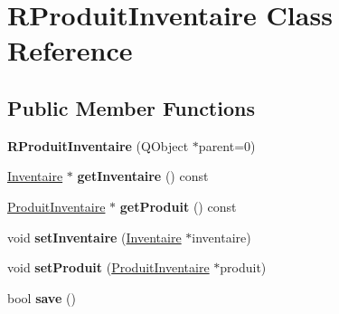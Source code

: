 \hypertarget{class_r_produit_inventaire}{
\section{RProduitInventaire Class Reference}
\label{class_r_produit_inventaire}
}
\subsection*{Public Member Functions}
\begin{DoxyCompactItemize}
\item 
\hypertarget{class_r_produit_inventaire_a7edd21af5158dd125d0ae7ff91bfc391}{
{\bfseries RProduitInventaire} (QObject $\ast$parent=0)}
\label{class_r_produit_inventaire_a7edd21af5158dd125d0ae7ff91bfc391}

\item 
\hypertarget{class_r_produit_inventaire_ab65a7c14d395b850cd735cce3dcfb03a}{
\hyperlink{class_inventaire}{Inventaire} $\ast$ {\bfseries getInventaire} () const }
\label{class_r_produit_inventaire_ab65a7c14d395b850cd735cce3dcfb03a}

\item 
\hypertarget{class_r_produit_inventaire_aed628da2298761c05331f800b2bbc09b}{
\hyperlink{class_produit_inventaire}{ProduitInventaire} $\ast$ {\bfseries getProduit} () const }
\label{class_r_produit_inventaire_aed628da2298761c05331f800b2bbc09b}

\item 
\hypertarget{class_r_produit_inventaire_a545659f533dbd93b5349a62e88df1c49}{
void {\bfseries setInventaire} (\hyperlink{class_inventaire}{Inventaire} $\ast$inventaire)}
\label{class_r_produit_inventaire_a545659f533dbd93b5349a62e88df1c49}

\item 
\hypertarget{class_r_produit_inventaire_a12d8a7cfbc78a77f5666959a4d90427e}{
void {\bfseries setProduit} (\hyperlink{class_produit_inventaire}{ProduitInventaire} $\ast$produit)}
\label{class_r_produit_inventaire_a12d8a7cfbc78a77f5666959a4d90427e}

\item 
\hypertarget{class_r_produit_inventaire_aceb76d4c17705a748b92a3c409277c1d}{
bool {\bfseries save} ()}
\label{class_r_produit_inventaire_aceb76d4c17705a748b92a3c409277c1d}

\end{DoxyCompactItemize}
